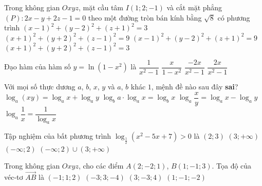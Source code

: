 \begin{ex}%
	Trong không gian $Oxyz$, mặt cầu tâm $I(1;2;-1)$ và cắt mặt phẳng $(P): 2x-y+2z-1=0$ theo một đường tròn bán kính bằng $\sqrt{8}$ có phương trình 
	\choice
	{$(x-1)^2 + (y-2)^2 + (z+1)^2=3$}
	{$(x+1)^2 + (y+2)^2 + (z-1)^2=9$}
	{\True $(x-1)^2 + (y-2)^2 + (z+1)^2=9$}
	{$(x+1)^2 + (y+2)^2 + (z-1)^2=3$}
\end{ex} \begin{ex}%
	Đạo hàm của hàm số $y=\ln\left(1-x^2\right)$ là
	\choice
	{$\dfrac{1}{x^2-1}$}
	{$\dfrac{x}{1-x^2}$}
	{\True $\dfrac{-2x}{x^2-1}$}
	{$\dfrac{2x}{x^2-1}$}
\end{ex}

\begin{ex}%
	Với mọi số thực dương $a$, $b$, $x$, $y$ và $a$, $b$ khác $1$, mệnh đề nào sau đây \textbf{sai}?
	\choice
	{$\log_a(xy)=\log_ax+\log_ay$}
	{$\log_ba\cdot\log_ax=\log_bx$}
	{$\log_a\dfrac{x}{y}=\log_ax-\log_ay$}
	{\True $\log_a\dfrac{1}{x}=\dfrac{1}{\log_ax}$}
\end{ex}

\begin{ex}%
	Tập nghiệm của bất phương trình $\log_{\tfrac{1}{2}}\left(x^2-5x+7\right)>0$ là
	\choice
	{\True $(2;3)$}
	{$(3;+\infty)$}
	{$(-\infty;2)$}
	{$(-\infty;2)\cup(3;+\infty)$}
\end{ex}

\begin{ex}%
	Trong không gian $Oxyz$, cho các điểm $A(2;-2;1)$, $B(1;-1;3)$. Tọa độ của véc-tơ $\overrightarrow{AB}$ là
	\choice
	{\True $(-1;1;2)$}
	{$(-3;3;-4)$}
	{$(3;-3;4)$}
	{$(1;-1;-2)$}
\end{ex}

